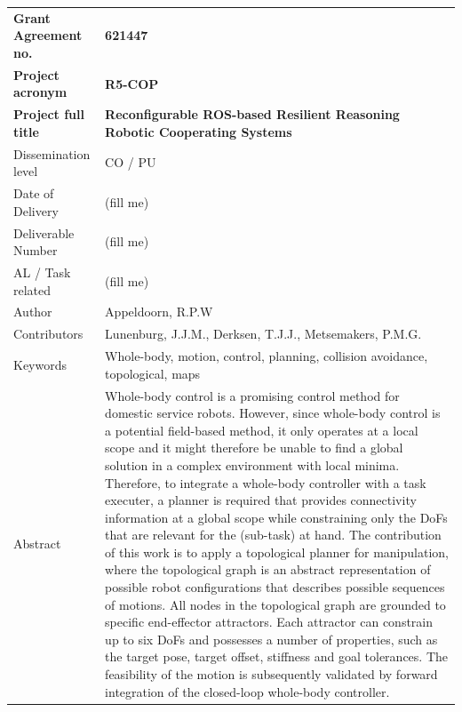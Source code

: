 \begin{tabular}{|p{4.5cm}p{11cm}|}
\hline
\rowcolor[gray]{0.8}
\bf Grant Agreement no.
	& \bf 621447\\
\rowcolor[gray]{0.8}
\bf Project acronym
	& \bf R5-COP\\
\rowcolor[gray]{0.8}
\bf	Project full title
	& \bf Reconfigurable ROS-based Resilient Reasoning Robotic Cooperating Systems\\
\hline

Dissemination level
	& CO / PU\\
Date of Delivery
	& (fill me)\\
Deliverable Number
	& (fill me)\\
AL / Task related
	& (fill me)\\
Author
	& Appeldoorn, R.P.W\\
Contributors
	& Lunenburg, J.J.M., Derksen, T.J.J., Metsemakers, P.M.G.\\
Keywords
	& Whole-body, motion, control, planning, collision avoidance, topological, maps\\
Abstract &
	Whole-body control is a promising control method for domestic service robots. However, since
whole-body control is a potential field-based method, it only operates at a local scope and it
might therefore be unable to find a global solution in a complex environment with local minima.
Therefore, to integrate a whole-body controller with a task executer, a planner is required that
provides connectivity information at a global scope while constraining only the DoFs that are
relevant for the (sub-task) at hand. The contribution of this work is to apply a topological
planner for manipulation, where the topological graph is an abstract representation of possible
robot configurations that describes possible sequences of motions. All nodes in the topological
graph are grounded to specific end-effector attractors. Each attractor can constrain up to six
DoFs and possesses a number of properties, such as the target pose, target offset, stiffness and
goal tolerances. The feasibility of the motion is subsequently validated by forward integration
of the closed-loop whole-body controller.\\
\hline
\end{tabular}
\vfill\eject
